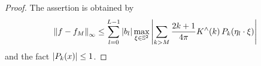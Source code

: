 \documentclass[11pt,a4paper,twoside,bibtotoc]{scrartcl}
\theoremstyle{plain}
\theoremstyle{definition}
\theoremstyle{remark}
\newcommand{\fun}[2]{\ensuremath{#1{\hspace{-0.4ex}}\left(#2\right)}}
\newcommand{\dx}{\text{\rm{d}}}
\numberwithin{equation}{section}
\numberwithin{table}{section}
\numberwithin{figure}{section}
\begin{document}
\begin{proof}
  The assertion is obtained by
  \begin{equation*}
    \left\|f - f_{M}\right\|_{\infty} 
     \le \sum_{l=0}^{L-1} \left| b_{l} \right| \max_{\mathbf{\xi} \in \mathbb{S}^2} \left| \sum_{k>M} 
          \frac{2k+1}{4\pi} \fun{K^{\wedge}}{k} \fun{P_{k}}{\mathbf{\eta}_{l} \cdot
    \mathbf{\xi}} \right|
  \end{equation*}
  and the fact $\left|\fun{P_{k}}{x}\right| \le 1$. 

\end{proof}
\end{document}

